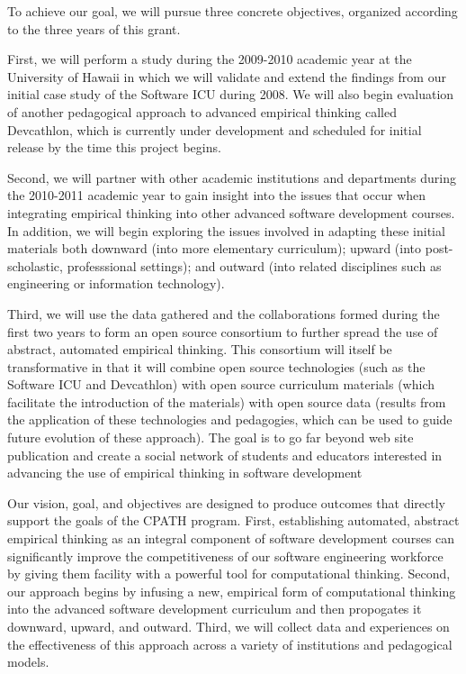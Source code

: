 To achieve our goal, we will pursue three concrete objectives, organized
according to the three years of this grant.  

First, we will perform a study during the 2009-2010 academic year at the
University of Hawaii in which we will validate and extend the findings from
our initial case study of the Software ICU during 2008.  We will also begin
evaluation of another pedagogical approach to advanced empirical thinking
called Devcathlon, which is currently under development and scheduled for
initial release by the time this project begins.

Second, we will partner with other academic institutions and departments
during the 2010-2011 academic year to gain insight into the issues that
occur when integrating empirical thinking into other advanced software
development courses.  In addition, we will begin exploring the issues
involved in adapting these initial materials both downward (into more
elementary curriculum); upward (into post-scholastic, professsional
settings); and outward (into related disciplines such as engineering or
information technology).

Third, we will use the data gathered and the collaborations formed during
the first two years to form an open source consortium to further spread the
use of abstract, automated empirical thinking.  This consortium will itself
be transformative in that it will combine open source technologies (such as
the Software ICU and Devcathlon) with open source curriculum materials
(which facilitate the introduction of the materials) with open source data
(results from the application of these technologies and pedagogies, which
can be used to guide future evolution of these approach).  The goal is to
go far beyond web site publication and create a social network of students
and educators interested in advancing the use of empirical thinking in
software development

Our vision, goal, and objectives are designed to produce outcomes that
directly support the goals of the CPATH program.  First, establishing
automated, abstract empirical thinking as an integral component of software
development courses can significantly improve the competitiveness of our
software engineering workforce by giving them facility with a powerful tool
for computational thinking.  Second, our approach begins by infusing a new,
empirical form of computational thinking into the advanced software
development curriculum and then propogates it downward, upward, and
outward.  Third, we will collect data and experiences on the effectiveness
of this approach across a variety of institutions and pedagogical models.

